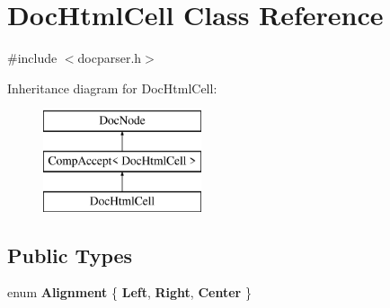 \hypertarget{class_doc_html_cell}{}\section{Doc\+Html\+Cell Class Reference}
\label{class_doc_html_cell}


{\ttfamily \#include $<$docparser.\+h$>$}

Inheritance diagram for Doc\+Html\+Cell\+:\begin{figure}[H]
\begin{center}
\leavevmode
\includegraphics[height=3.000000cm]{class_doc_html_cell}
\end{center}
\end{figure}
\subsection*{Public Types}
\begin{DoxyCompactItemize}
\item 
\mbox{\label{class_doc_html_cell_a1bfba233eb785db3496ea2a82d9a2136}} 
enum {\bfseries Alignment} \{ {\bfseries Left}, 
{\bfseries Right}, 
{\bfseries Center}
 \}
\end{DoxyCompactItemize}
